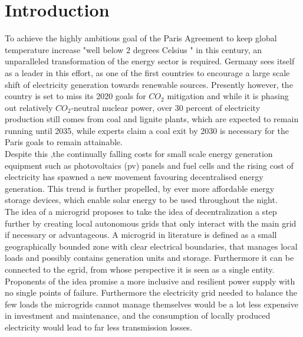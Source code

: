 \documentclass[
	11pt,								%
	DIV10,								%
	a4paper,         					%
	oneside,							%
	headheight=20pt,					%
	footheight=20pt,					%
    parskip=full,						%
    listof=totoc,						%
	bibliography=totoc,					%
	index=totoc,						%
]{scrartcl}
\begin{document}




\section{Introduction}
To achieve the highly ambitious goal of the Paris Agreement to keep global temperature increase "well below 2 degrees Celsius " in this century, an unparalleled transformation of the energy sector is required. Germany sees itself as a leader in this effort, as one of the first countries to encourage a large scale shift of electricity generation towards renewable sources. Presently however, the country is set to miss its 2020 goals for $CO_2$ mitigation   and while it is phasing out relatively $CO_2$-neutral nuclear power, over 30 percent of electricity production still comes from coal and lignite plants, which are expected to remain running until 2035, while experts claim a coal exit by 2030 is necessary for the Paris goals to remain attainable.
\\
Despite this ,the continually falling costs for small scale energy generation equipment such as photovoltaics (pv) panels and fuel cells and the rising cost of electricity has spawned a new movement favouring decentralised energy generation. This trend is further propelled, by ever more affordable energy storage devices, which enable solar energy to be used throughout the night.
\\
The idea of a microgrid proposes to take the idea of decentralization a step further by creating local autonomous grids that only interact with the main grid if necessary or advantageous.
A microgrid in literature is defined as a small geographically bounded zone with clear electrical boundaries, that manages local loads and possibly contains generation units and storage. Furthermore it can be connected to the egrid, from whose perspective it is seen as a single entity. \\
Proponents of the idea promise a more inclusive and resilient power supply with no single points of failure. Furthermore the electricity grid needed to balance the few loads the microgrids cannot manage themselves would be a lot less expensive in investment and maintenance, and the consumption of locally produced electricity would lead to far less transmission losses.
\end{document}
